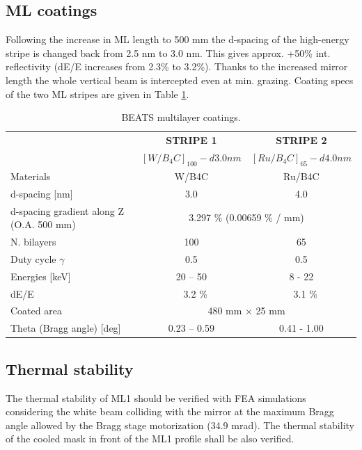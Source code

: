\subsection{ML coatings}
Following the increase in ML length to 500 mm the d-spacing of the high-energy stripe is changed back from 2.5 nm to 3.0 nm. This gives approx. +50\% int. reflectivity (dE/E increases from 2.3\% to 3.2\%). Thanks to the increased mirror length the whole vertical beam is intercepted even at min. grazing. Coating specs of the two ML stripes are given in Table \ref{tab:coatings}.
\begin{center}
\begin{table}[h]
\begin{tabular}[bhp]{| l | c | c |}
\hline
 & \textbf{STRIPE 1} & \textbf{STRIPE 2} \\
 & \textbf{$[W/B_{4}C]_{100} - d 3.0 nm $} & \textbf{$[Ru/B_{4}C]_{65} - d 4.0 nm $} \\
\hline
Materials & W/B4C & Ru/B4C \\
d-spacing [nm] & 3.0 & 4.0 \\
d-spacing gradient along Z (O.A. 500 mm) & \multicolumn{2}{c|}{3.297 \% (0.00659 \% / mm)} \\ 
N. bilayers & 100 & 65 \\
Duty cycle $\gamma$ & 0.5 & 0.5 \\
Energies [keV] & 20 – 50 & 8 - 22 \\
dE/E & ~ 3.2 \% & ~ 3.1 \% \\
Coated area & \multicolumn{2}{c|}{480 mm × 25 mm} \\
Theta (Bragg angle) [deg] & 0.23 – 0.59 & 0.41 - 1.00 \\
\hline
\end{tabular}
\caption{\label{tab:coatings} BEATS multilayer coatings.}
\end{table}
\end{center}

\clearpage

% 

\clearpage
\subsection{Thermal stability}
The thermal stability of ML1 should be verified with FEA simulations considering the white beam colliding with the mirror at the maximum Bragg angle allowed by the Bragg stage motorization (34.9 mrad). The thermal stability of the cooled mask in front of the ML1 profile shall be also verified.\\

